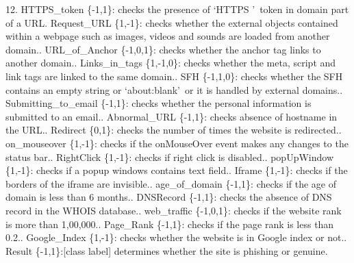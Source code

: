 \documentclass[12pt]{article}
\begin{document}
12. HTTPS\_token \{-1,1\}: checks the presence of \lq HTTPS \rq\ token in domain part of a URL. Request\_URL \{1,-1\}: checks whether the external objects contained within a webpage such as images, videos and sounds are loaded from another domain.. URL\_of\_Anchor \{-1,0,1\}: checks whether the anchor tag links to another domain.. Links\_in\_tags \{1,-1,0\}: checks whether the meta, script and link tags are linked to the same domain.. SFH \{-1,1,0\}: checks whether the SFH contains an empty string or \lq about:blank\rq\ or it is handled by external domains.. Submitting\_to\_email \{-1,1\}: checks whether the personal information is submitted to an email.. Abnormal\_URL \{-1,1\}: checks absence of hostname in the URL.. Redirect \{0,1\}: checks the number of times the website is redirected.. on\_mouseover \{1,-1\}: checks if the onMouseOver event makes any changes to the status bar.. RightClick \{1,-1\}: checks if right click is disabled.. popUpWindow \{1,-1\}: checks if a popup windows contains text field.. Iframe \{1,-1\}: checks if the borders of the iframe are invisible.. age\_of\_domain \{-1,1\}: checks if the age of domain is less than 6 months.. DNSRecord \{-1,1\}: checks the absence of DNS record in the WHOIS database.. web\_traffic \{-1,0,1\}: checks if the website rank is more than 1,00,000.. Page\_Rank \{-1,1\}: checks if the page rank is less than 0.2.. Google\_Index \{1,-1\}: checks whether the website is in Google index or not.. Result \{-1,1\}:[class label] determines whether the site is phishing or genuine.

\pagestyle{fancy}
\renewcommand{\headrulewidth}{0pt}

\newpage
\end{document}
